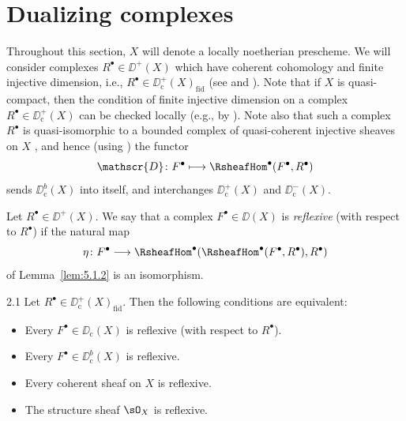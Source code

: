 \section{Dualizing complexes}\label{sec:5.2}
\begingroup
\setlength{\emergencystretch}{2em}

Throughout this section, $X$ will denote a locally noetherian prescheme. We will consider complexes $R^\bullet\in\DD^+(X)$ which have coherent cohomology and finite injective dimension, i.e., $R^\bullet\in\DD_{\mathrm{c}}^+(X)_{\mathrm{fid}}$ (see  and ). Note that if $X$ is quasi-compact, then the condition of finite injective dimension on a complex $R^\bullet\in\DD_{\mathrm{c}}^+(X)$ can be checked locally (e.g., by ). Note also that such a complex $R^\bullet$ is quasi-isomorphic to a bounded complex of quasi-coherent injective sheaves on $X$ , and hence (using ) the functor
\[
\mathscr{D}\colon F^{\bullet}\longmapsto \RsheafHom^{\bullet}(F^{\bullet}, R^{\bullet})
\]
sends $\DD_{\mathrm{c}}^{b}(X)$ into itself, and interchanges $\DD_{\mathrm{c}}^{+}(X)$ and $\DD_{\mathrm{c}}^{-}(X)$.

\begin{definition*}
Let $R^\bullet\in\DD^+(X)$. We say that a complex $F^\bullet\in\DD(X)$ is \emph{reflexive} (with respect to $R^\bullet$) if the natural map
\[
\eta\colon F^{\bullet}\longrightarrow \RsheafHom^{\bullet}(\RsheafHom^{\bullet}(F^{\bullet}, R^{\bullet}), R^{\bullet})
\]
of Lemma~\ref{lem:5.1.2} is an isomorphism.
\end{definition*}

\begin{bookproposition}{2.1}\label{prop:5.2.1}
Let $R^\bullet\in\DD^+_{\mathrm{c}}(X)_{\mathrm{fid}}$. Then the following conditions are equivalent:
\begin{itemize}
\item[(i)] Every $F^\bullet\in\DD_{\mathrm{c}}(X)$ is reflexive (with respect to $R^\bullet$).
\item[(ii)] Every $F^\bullet\in\DD_{\mathrm{c}}^b(X)$ is reflexive.
\item[(iii)] Every coherent sheaf on $X$ is reflexive.
\item[(iv)] The structure sheaf $\sO_X$ is reflexive.
\end{itemize}
\end{bookproposition}

